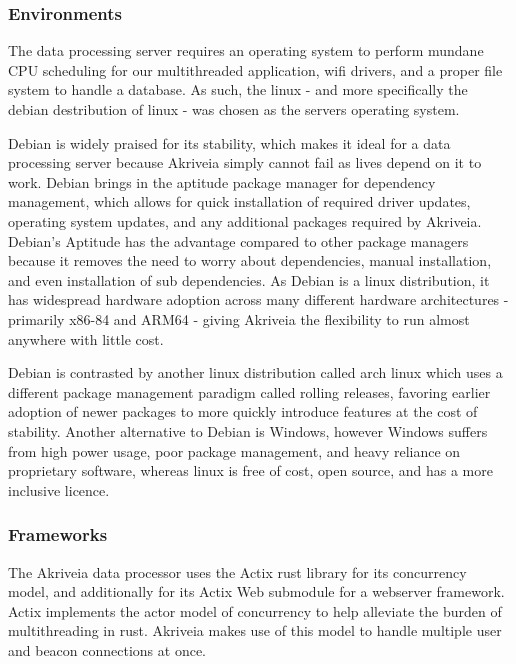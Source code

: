 \bigskip

\subsubsection{Environments}
The data processing server requires an operating system to perform mundane CPU scheduling for our multithreaded application, wifi drivers, and a proper file system to handle a database.
As such, the linux - and more specifically the debian destribution of linux - was chosen as the servers operating system.
\bigskip

Debian is widely praised for its stability, which makes it ideal for a data processing server because Akriveia simply cannot fail as lives depend on it to work.
Debian brings in the aptitude package manager for dependency management, which allows for quick installation of required driver updates, operating system updates, and any additional packages required by Akriveia.
Debian's Aptitude has the advantage compared to other package managers because it removes the need to worry about dependencies, manual installation, and even installation of sub dependencies.
As Debian is a linux distribution, it has widespread hardware adoption across many different hardware architectures - primarily x86-84 and ARM64 - giving Akriveia the flexibility to run almost anywhere with little cost.

Debian is contrasted by another linux distribution called arch linux which uses a different package management paradigm called rolling releases, favoring earlier adoption of newer packages to more quickly introduce features at the cost of stability.
Another alternative to Debian is Windows, however Windows suffers from high power usage, poor package management, and heavy reliance on proprietary software, whereas linux is free of cost, open source, and has a more inclusive licence.


\subsubsection{Frameworks}
The Akriveia data processor uses the Actix rust library for its concurrency model, and additionally for its Actix Web submodule for a webserver framework.
Actix implements the actor model of concurrency to help alleviate the burden of multithreading in rust.
Akriveia makes use of this model to handle multiple user and beacon connections at once.

